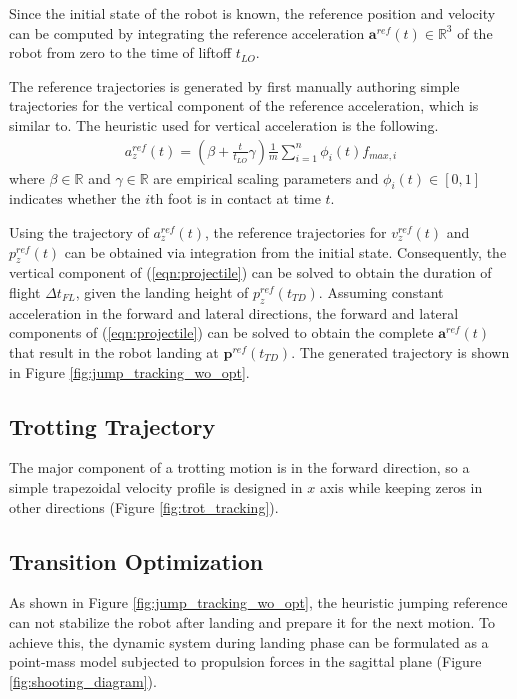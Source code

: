 \documentclass[11pt, conference]{IEEEtran}
\theoremstyle{definition} %
\newcommand{\RR}{\mathbb{R}}
\begin{document}
Since the initial state of the robot is known, the reference position and velocity can be computed by integrating the reference acceleration $\mathbf{a}^{ref}(t)\in\RR^3$ of the robot from zero to the time of liftoff $t_{LO}$.

The reference trajectories is generated by first manually authoring simple trajectories for the vertical component of the reference acceleration, which is similar to\cite{chignoli2021online}. The heuristic used for vertical acceleration is the following.
\begin{align}
    a_z^{ref}(t) = (\beta + \frac{t}{t_{LO}}\gamma)\frac{1}{m} \sum_{i=1}^{n}\phi_i(t)f_{max, i}
\end{align}
where $\beta\in\RR$ and $\gamma\in\RR$ are empirical scaling parameters and $\phi_i(t)\in [0, 1]$ indicates whether the $i$th foot is in contact at time $t$.

Using the trajectory of $a_z^{ref}(t)$, the reference trajectories for $v_z^{ref}(t)$ and $p_z^{ref}(t)$ can be obtained via integration from the initial state. Consequently, the vertical component of (\ref{eqn:projectile}) can be solved to obtain the duration of flight $\Delta t_{FL}$, given the landing height of ${p}^{ref}_z(t_{TD})$. Assuming constant acceleration in the forward and lateral directions, the forward and lateral components of (\ref{eqn:projectile}) can be solved to obtain the complete $\mathbf{a}^{ref}(t)$ that result in the robot landing at $\mathbf{p}^{ref}(t_{TD})$. The generated trajectory is shown in Figure \ref{fig:jump_tracking_wo_opt}.

\subsection{Trotting Trajectory}
The major component of a trotting motion is in the forward direction, so a simple trapezoidal velocity profile is designed in $x$ axis while keeping zeros in other directions (Figure \ref{fig:trot_tracking}).


\subsection{Transition Optimization}
As shown in Figure \ref{fig:jump_tracking_wo_opt}, the heuristic jumping reference can not stabilize the robot after landing and prepare it for the next motion. To achieve this, the dynamic system during landing phase can be formulated as a point-mass model subjected to propulsion forces in the sagittal plane (Figure \ref{fig:shooting_diagram}).
\end{document}
